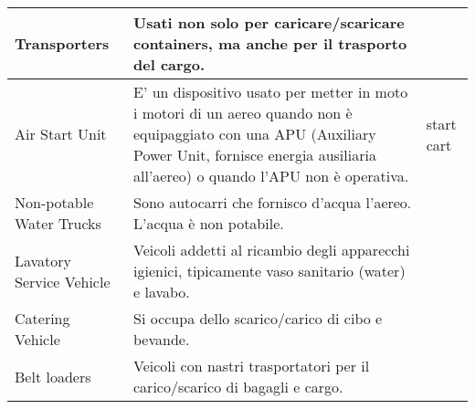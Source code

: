 \begin{landscape}
\begin{table}[htp]
{\begin{tabular}{p{}p{}p{}}
			\hline
			\textsf{\small Transporters} & \textsf{\small Usati non solo per caricare/scaricare containers, ma anche per il trasporto del cargo.} & \textsf{\small } \\
			\hline
			\textsf{\small Air Start Unit} & \textsf{\small E' un dispositivo usato per metter in moto i motori di un aereo quando non è equipaggiato con una APU (Auxiliary Power Unit, fornisce energia ausiliaria all'aereo) o quando l'APU non è operativa.} & \textsf{\small start cart} \\
			\hline
			\textsf{\small Non-potable Water Trucks} & \textsf{\small Sono autocarri che fornisco d'acqua l'aereo. L'acqua è non potabile.} & \textsf{\small } \\
			\hline
			\textsf{\small Lavatory Service Vehicle} & \textsf{\small Veicoli addetti al ricambio degli apparecchi igienici, tipicamente vaso sanitario (water) e lavabo.} & \textsf{\small } \\
			\hline
			\textsf{\small Catering Vehicle} & \textsf{\small Si occupa dello scarico/carico di cibo e bevande.} & \textsf{\small } \\
			\hline
			\textsf{\small Belt loaders} & \textsf{\small Veicoli con nastri trasportatori per il carico/scarico di bagagli e cargo.} & \textsf{\small } \\
			\hline
		\end{tabular}%
	}%
\end{table}
\end{landscape}
\pagebreak
